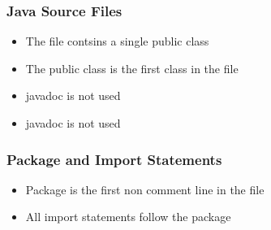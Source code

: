 \subsubsection{Java Source Files}
\begin{itemize}
\item The file contsins  a single public class\\
\item The public class is the first class in the file\\
\item javadoc is not used
\item javadoc is not used
\end{itemize}

\subsubsection{Package and Import Statements}
\begin{itemize}
\item Package is the first non comment line in the file\\
\item All import statements follow the package\\ 
\end{itemize}

